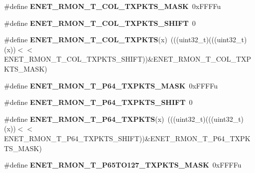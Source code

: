 \begin{DoxyCompactItemize}
\item 
\#define {\bfseries E\+N\+E\+T\+\_\+\+R\+M\+O\+N\+\_\+\+T\+\_\+\+C\+O\+L\+\_\+\+T\+X\+P\+K\+T\+S\+\_\+\+M\+A\+SK}~0x\+F\+F\+F\+Fu\hypertarget{group__ENET__Register__Masks_ga2acdc948ff9f17ae66ed9efd053cf3f4}{}\label{group__ENET__Register__Masks_ga2acdc948ff9f17ae66ed9efd053cf3f4}

\item 
\#define {\bfseries E\+N\+E\+T\+\_\+\+R\+M\+O\+N\+\_\+\+T\+\_\+\+C\+O\+L\+\_\+\+T\+X\+P\+K\+T\+S\+\_\+\+S\+H\+I\+FT}~0\hypertarget{group__ENET__Register__Masks_ga04f557da802770a52c52f3e7eda944de}{}\label{group__ENET__Register__Masks_ga04f557da802770a52c52f3e7eda944de}

\item 
\#define {\bfseries E\+N\+E\+T\+\_\+\+R\+M\+O\+N\+\_\+\+T\+\_\+\+C\+O\+L\+\_\+\+T\+X\+P\+K\+TS}(x)~(((uint32\+\_\+t)(((uint32\+\_\+t)(x))$<$$<$E\+N\+E\+T\+\_\+\+R\+M\+O\+N\+\_\+\+T\+\_\+\+C\+O\+L\+\_\+\+T\+X\+P\+K\+T\+S\+\_\+\+S\+H\+I\+FT))\&E\+N\+E\+T\+\_\+\+R\+M\+O\+N\+\_\+\+T\+\_\+\+C\+O\+L\+\_\+\+T\+X\+P\+K\+T\+S\+\_\+\+M\+A\+SK)\hypertarget{group__ENET__Register__Masks_ga0e3dd240f2ffd82851fe62e850caa39a}{}\label{group__ENET__Register__Masks_ga0e3dd240f2ffd82851fe62e850caa39a}

\item 
\#define {\bfseries E\+N\+E\+T\+\_\+\+R\+M\+O\+N\+\_\+\+T\+\_\+\+P64\+\_\+\+T\+X\+P\+K\+T\+S\+\_\+\+M\+A\+SK}~0x\+F\+F\+F\+Fu\hypertarget{group__ENET__Register__Masks_ga1db32099fbc7f82b96894eceb27fadc7}{}\label{group__ENET__Register__Masks_ga1db32099fbc7f82b96894eceb27fadc7}

\item 
\#define {\bfseries E\+N\+E\+T\+\_\+\+R\+M\+O\+N\+\_\+\+T\+\_\+\+P64\+\_\+\+T\+X\+P\+K\+T\+S\+\_\+\+S\+H\+I\+FT}~0\hypertarget{group__ENET__Register__Masks_gac06c1d984f1ef4f7fe433830c0c45398}{}\label{group__ENET__Register__Masks_gac06c1d984f1ef4f7fe433830c0c45398}

\item 
\#define {\bfseries E\+N\+E\+T\+\_\+\+R\+M\+O\+N\+\_\+\+T\+\_\+\+P64\+\_\+\+T\+X\+P\+K\+TS}(x)~(((uint32\+\_\+t)(((uint32\+\_\+t)(x))$<$$<$E\+N\+E\+T\+\_\+\+R\+M\+O\+N\+\_\+\+T\+\_\+\+P64\+\_\+\+T\+X\+P\+K\+T\+S\+\_\+\+S\+H\+I\+FT))\&E\+N\+E\+T\+\_\+\+R\+M\+O\+N\+\_\+\+T\+\_\+\+P64\+\_\+\+T\+X\+P\+K\+T\+S\+\_\+\+M\+A\+SK)\hypertarget{group__ENET__Register__Masks_gabad226cdad5fe7803f060d4379980bd2}{}\label{group__ENET__Register__Masks_gabad226cdad5fe7803f060d4379980bd2}

\item 
\#define {\bfseries E\+N\+E\+T\+\_\+\+R\+M\+O\+N\+\_\+\+T\+\_\+\+P65\+T\+O127\+\_\+\+T\+X\+P\+K\+T\+S\+\_\+\+M\+A\+SK}~0x\+F\+F\+F\+Fu\hypertarget{group__ENET__Register__Masks_gaebb8723106917311976e5e457d535e81}{}\label{group__ENET__Register__Masks_gaebb8723106917311976e5e457d535e81}


\end{DoxyCompactItemize}
